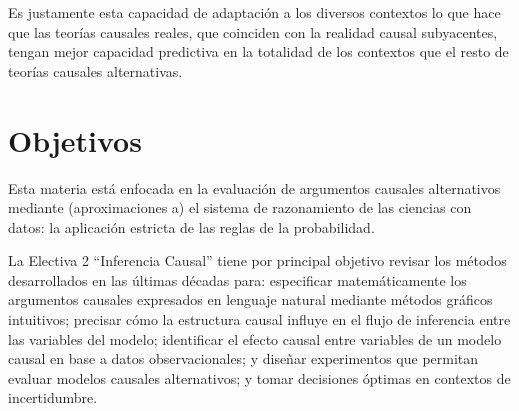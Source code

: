 \documentclass[11pt]{article}
\begin{document}
Es justamente esta capacidad de adaptación a los diversos contextos lo que hace que las teorías causales reales, que coinciden con la realidad causal subyacentes, tengan mejor capacidad predictiva en la totalidad de los contextos que el resto de teorías causales alternativas.

%
\section{Objetivos}

\begin{mdframed}
Esta materia está enfocada en la evaluación de argumentos causales alternativos mediante (aproximaciones a) el sistema de razonamiento de las ciencias con datos: la aplicación estricta de las reglas de la probabilidad.
\end{mdframed}


La Electiva 2 ``Inferencia Causal'' tiene por principal objetivo revisar los métodos desarrollados en las últimas décadas para: especificar matemáticamente los argumentos causales expresados en lenguaje natural mediante métodos gráficos intuitivos; precisar cómo la estructura causal influye en el flujo de inferencia entre las variables del modelo; identificar el efecto causal entre variables de un modelo causal en base a datos observacionales; y diseñar experimentos que permitan evaluar modelos causales alternativos; y tomar decisiones óptimas en contextos de incertidumbre.
\end{document}
